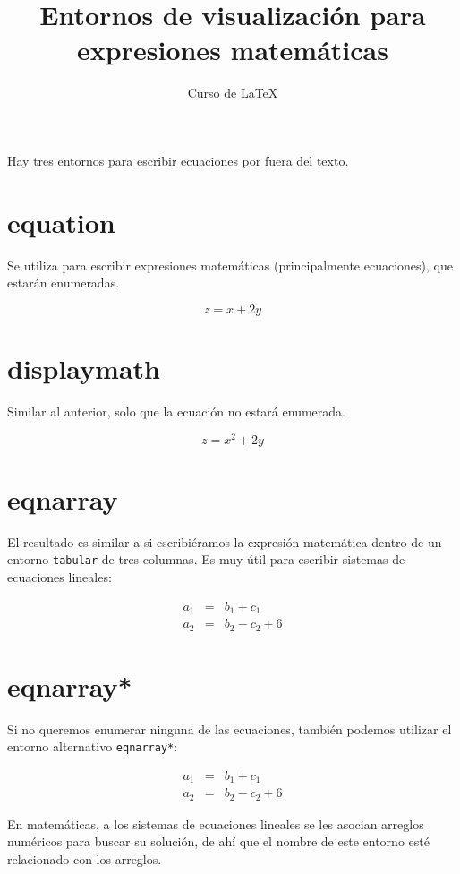 \documentclass[12pt,letterpaper]{article}
\author{Curso de \LaTeX}
\title{Entornos de visualización para expresiones matemáticas}
\begin{document}
\maketitle

Hay tres entornos para escribir ecuaciones por fuera del texto.

\section{equation}

Se utiliza para escribir expresiones matemáticas (principalmente ecuaciones), que estarán enumeradas.

\begin{equation}
z = x + 2y
\end{equation}

\section{displaymath}

Similar al anterior, solo que la ecuación no estará enumerada. 

\begin{displaymath}
z = x^2 + 2y
\end{displaymath}


\section{eqnarray}

El resultado es similar a si escribiéramos la expresión matemática dentro de un entorno \texttt{tabular} de tres columnas. Es muy útil para escribir sistemas de ecuaciones lineales:

\begin{eqnarray}
a_1 & = & b_1 + c_1\nonumber\\
a_2 & = & b_2 - c_2 + 6
\end{eqnarray}


\section{eqnarray*}

Si no queremos enumerar ninguna de las ecuaciones, también podemos utilizar el entorno alternativo \texttt{eqnarray*}:

\begin{eqnarray*}
	a_1 & = & b_1 + c_1\\
	a_2 & = & b_2 - c_2 + 6
\end{eqnarray*}

En matemáticas, a los sistemas de ecuaciones lineales se les asocian arreglos numéricos para buscar su solución, de ahí que el nombre de este entorno esté relacionado con los arreglos.
\end{document}
